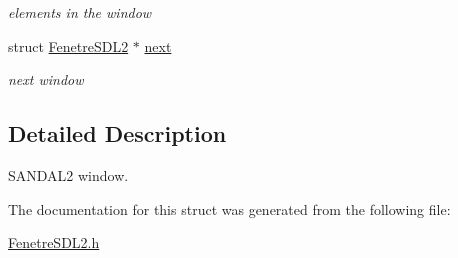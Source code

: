 \begin{DoxyCompactItemize}
\begin{DoxyCompactList}\small\item\em elements in the window \end{DoxyCompactList}\item 
struct \hyperlink{structFenetreSDL2}{Fenetre\+S\+D\+L2} $\ast$ \hyperlink{structFenetreSDL2_af33557a17195576675f370ee98849954}{next}\hypertarget{structFenetreSDL2_af33557a17195576675f370ee98849954}{}\label{structFenetreSDL2_af33557a17195576675f370ee98849954}

\begin{DoxyCompactList}\small\item\em next window \end{DoxyCompactList}\end{DoxyCompactItemize}


\subsection{Detailed Description}
S\+A\+N\+D\+A\+L2 window. 

The documentation for this struct was generated from the following file\+:\begin{DoxyCompactItemize}
\item 
\hyperlink{FenetreSDL2_8h}{Fenetre\+S\+D\+L2.\+h}\end{DoxyCompactItemize}
